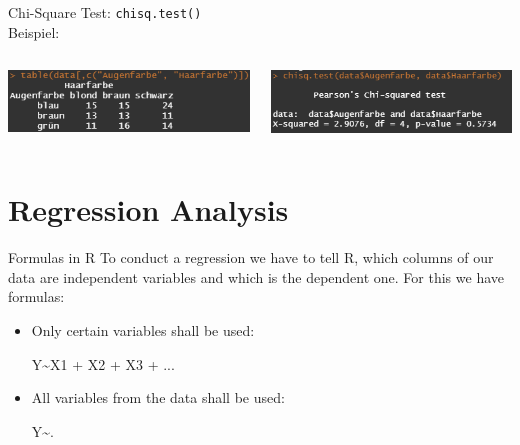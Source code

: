 \documentclass[xcolor=dvipsnames, aspectratio = 169]{beamer}
\begin{document}
\begin{frame}[fragile]{Chi-Square Test:}	
	\verb+chisq.test()+ \\

	Beispiel: \\
	\begin{columns}[T]
		\begin{column}{0.5\textwidth}
			\includegraphics[width=7.5cm]{tabledata}
		\end{column}
		\begin{column}{0.5\textwidth}
			\includegraphics[width=7.5cm]{chisq}
		\end{column}
	\end{columns}
\end{frame}


\section{Regression Analysis}

\begin{frame}[fragile]{Formulas in R}
	To conduct a regression we have to tell R, which columns of our data are independent variables and which is the dependent one. For this we have formulas:
	\begin{itemize}
		\item Only certain variables shall be used:
			\begin{center}
				Y\textasciitilde X1 + X2 + X3 + ... 
			\end{center}
		\item All variables from the data shall be used:
			\begin{center}
				Y\textasciitilde.
			\end{center}
	\end{itemize}
\end{frame}
\end{document}
